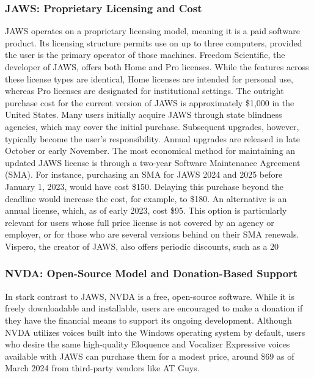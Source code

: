 \subsubsection{JAWS: Proprietary Licensing and Cost}
JAWS operates on a proprietary licensing model, meaning it is a paid software product.\supercite{kingsbury2025} Its licensing structure permits use on up to three computers, provided the user is the primary operator of those machines. Freedom Scientific, the developer of JAWS, offers both Home and Pro licenses. While the features across these license types are identical, Home licenses are intended for personal use, whereas Pro licenses are designated for institutional settings.\supercite{kingsbury2025}
The outright purchase cost for the current version of JAWS is approximately \$1,000 in the United States. Many users initially acquire JAWS through state blindness agencies, which may cover the initial purchase. Subsequent upgrades, however, typically become the user's responsibility.\supercite{kingsbury2025} Annual upgrades are released in late October or early November. The most economical method for maintaining an updated JAWS license is through a two-year Software Maintenance Agreement (SMA). For instance, purchasing an SMA for JAWS 2024 and 2025 before January 1, 2023, would have cost \$150. Delaying this purchase beyond the deadline would increase the cost, for example, to \$180.\supercite{kingsbury2025} An alternative is an annual license, which, as of early 2023, cost \$95. This option is particularly relevant for users whose full price license is not covered by an agency or employer, or for those who are several versions behind on their SMA renewals.\supercite{kingsbury2025} Vispero, the creator of JAWS, also offers periodic discounts, such as a 20%
\subsubsection{NVDA: Open-Source Model and Donation-Based Support}
In stark contrast to JAWS, NVDA is a free, open-source software.\supercite{kingsbury2025} While it is freely downloadable and installable, users are encouraged to make a donation if they have the financial means to support its ongoing development.\supercite{kingsbury2025} Although NVDA utilizes voices built into the Windows operating system by default, users who desire the same high-quality Eloquence and Vocalizer Expressive voices available with JAWS can purchase them for a modest price, around \$69 as of March 2024 from third-party vendors like AT Guys.\supercite{kingsbury2025}
